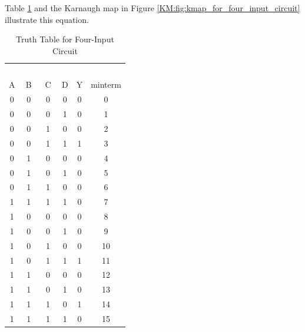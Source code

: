 Table \ref{KM:tab:truth_table_for_4-input_circuit} and the Karnaugh map in Figure \ref{KM:fig:kmap_for_four_input_circuit} illustrate this equation.

\begin{table}[H]
  \sffamily
  \newcommand{\head}[1]{\textcolor{white}{\textbf{#1}}}    
  \begin{center}
    \begin{tabular}{cccccc} 
      \rowcolor{black!75}
      \multicolumn{4}{c}{\head{Inputs}} & \multicolumn{2}{l}{\head{Output}} \\
      A & B & C & D & Y & minterm \\
      \hline
      0 & 0 & 0 & 0 & 0 & 0 \\
      0 & 0 & 0 & 1 & 0 & 1 \\
      0 & 0 & 1 & 0 & 0 & 2 \\
      0 & 0 & 1 & 1 & 1 & 3 \\ 
      0 & 1 & 0 & 0 & 0 & 4 \\
      0 & 1 & 0 & 1 & 0 & 5 \\
      0 & 1 & 1 & 0 & 0 & 6 \\
      1 & 1 & 1 & 1 & 0 & 7 \\
      1 & 0 & 0 & 0 & 0 & 8 \\
      1 & 0 & 0 & 1 & 0 & 9 \\
      1 & 0 & 1 & 0 & 0 & 10 \\
      1 & 0 & 1 & 1 & 1 & 11 \\ 
      1 & 1 & 0 & 0 & 0 & 12 \\
      1 & 1 & 0 & 1 & 0 & 13 \\
      1 & 1 & 1 & 0 & 1 & 14 \\
      1 & 1 & 1 & 1 & 0 & 15  
    \end{tabular}
  \end{center}
  \caption{Truth Table for Four-Input Circuit}
  \label{KM:tab:truth_table_for_4-input_circuit}
\end{table}

